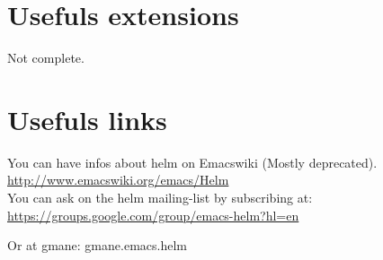 \documentclass[a4paper,11pt]{article}
\begin{document}
\section{Usefuls extensions}
\label{sec:usefuls-extensions}
Not complete.

\section{Usefuls links}
\label{sec:usefuls-links}

You can have infos about helm on Emacswiki (Mostly deprecated).\\
\url{http://www.emacswiki.org/emacs/Helm}\\

You can ask on the helm mailing-list by subscribing at:\\
\url{https://groups.google.com/group/emacs-helm?hl=en}

Or at gmane: gmane.emacs.helm
\end{document}
